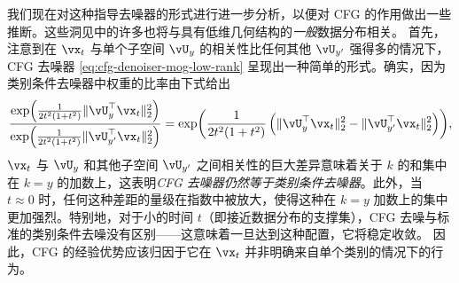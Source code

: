 \documentclass[../../book-main.tex]{subfiles}
\begin{document}
\begin{example}
  我们现在对这种指导去噪器的形式进行进一步分析，以便对 CFG 的作用做出一些推断。这些洞见中的许多也将与具有低维几何结构的\textit{一般}数据分布相关。
  首先，注意到在 $\vx_t$ 与单个子空间 $\vU_y$ 的相关性比任何其他 $\vU_{y'}$ 强得多的情况下，CFG 去噪器 \eqref{eq:cfg-denoiser-mog-low-rank} 呈现出一种简单的形式。确实，因为类别条件去噪器中权重的比率由下式给出
  \begin{equation}
    \frac{
      \exp\rp{\frac{1}{2t^{2}(1 + t^{2})}\norm{\vU_{y}^{\top}\vx_t}_{2}^{2}}
    }{
      \exp\rp{\frac{1}{2t^{2}(1 + t^{2})}\norm{\vU_{y'}^{\top}\vx_t}_{2}^{2}}
    }
    =
    \exp\rp{
      \frac{1}{2t^{2}(1 + t^{2})}\left(
      \norm{\vU_{y}^{\top}\vx_t}_{2}^{2}
      -
      \norm{\vU_{y'}^{\top}\vx_t}_{2}^{2}
      \right)
    },
  \end{equation}
  $\vx_t$ 与 $\vU_{y}$ 和其他子空间 $\vU_{y'}$ 之间相关性的巨大差异意味着关于 $k$ 的和集中在 $k=y$ 的加数上，这表明\textit{CFG 去噪器仍然等于类别条件去噪器}。此外，当 $t \approx 0$ 时，任何这种差距的量级在指数中被放大，使得这种在 $k=y$ 加数上的集中更加强烈。特别地，对于小的时间 $t$（即接近数据分布的支撑集），CFG 去噪与标准的类别条件去噪没有区别——这意味着一旦达到这种配置，它将稳定收敛。
  因此，CFG 的经验优势应该归因于它在 $\vx_t$ 并非明确来自单个类别的情况下的行为。


\end{example}
\end{document}
